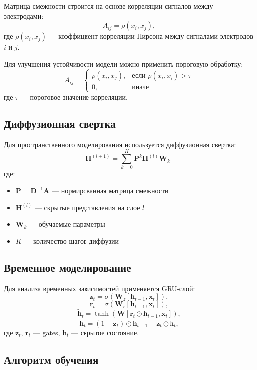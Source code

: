 \documentclass[12pt, twoside]{article}
\begin{document}
Матрица смежности строится на основе корреляции сигналов между электродами:
\begin{equation}
A_{ij} = \rho(x_i, x_j),
\end{equation}
где $\rho(x_i, x_j)$ — коэффициент корреляции Пирсона между сигналами электродов $i$ и $j$.

Для улучшения устойчивости модели можно применить пороговую обработку:
\begin{equation}
A_{ij} = \begin{cases}
\rho(x_i, x_j), & \text{если } \rho(x_i, x_j) > \tau \\
0, & \text{иначе}
\end{cases}
\end{equation}
где $\tau$ — пороговое значение корреляции.


\subsection{Диффузионная свертка}

Для пространственного моделирования используется диффузионная свертка:
\[
\mathbf{H}^{(l+1)} = \sum_{k=0}^{K} \mathbf{P}^k \mathbf{H}^{(l)} \mathbf{W}_k,
\]
где:
\begin{itemize}
    \item $\mathbf{P} = \mathbf{D}^{-1}\mathbf{A}$ — нормированная матрица смежности
    \item $\mathbf{H}^{(l)}$ — скрытые представления на слое $l$
    \item $\mathbf{W}_k$ — обучаемые параметры
    \item $K$ — количество шагов диффузии
\end{itemize}

\subsection{Временное моделирование}

Для анализа временных зависимостей применяется GRU-слой:
\[
\mathbf{z}_t = \sigma(\mathbf{W}_z[\mathbf{h}_{t-1}, \mathbf{x}_t]),
\]
\[
\mathbf{r}_t = \sigma(\mathbf{W}_r[\mathbf{h}_{t-1}, \mathbf{x}_t]),
\]
\[
\tilde{\mathbf{h}}_t = \tanh(\mathbf{W}[\mathbf{r}_t \odot \mathbf{h}_{t-1}, \mathbf{x}_t]),
\]
\[
\mathbf{h}_t = (1-\mathbf{z}_t) \odot \mathbf{h}_{t-1} + \mathbf{z}_t \odot \tilde{\mathbf{h}}_t,
\]
где $\mathbf{z}_t$, $\mathbf{r}_t$ — gates, $\mathbf{h}_t$ — скрытое состояние.

\subsection{Алгоритм обучения}
\end{document}
